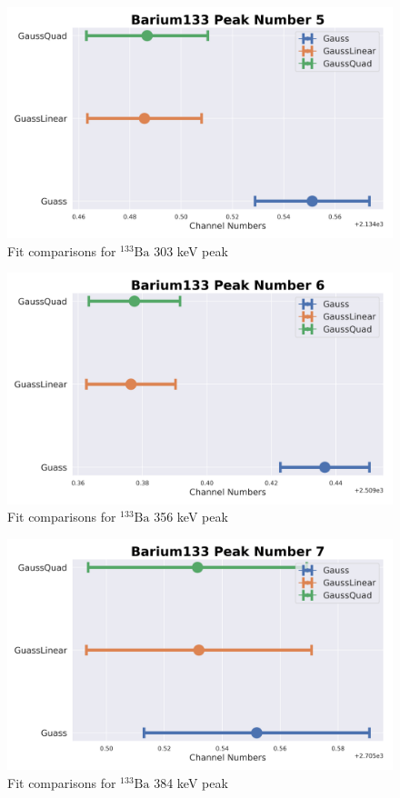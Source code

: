 \documentclass[11pt,a4paper]{article}
\newcommand{\element}[2]{$^{#2}\textrm{#1}$}
\begin{document}
\begin{figure}[H]
  \centering
  \includegraphics[width=0.95\linewidth]{./Images/Barium133/FitComparison_Peak5.png}
  \caption{Fit comparisons for \element{Ba}{133} 303 keV peak}
\end{figure}

\begin{figure}[H]
  \centering
  \includegraphics[width=0.95\linewidth]{./Images/Barium133/FitComparison_Peak6.png}
  \caption{Fit comparisons for \element{Ba}{133} 356 keV peak}
\end{figure}

\begin{figure}[H]
  \centering
  \includegraphics[width=0.95\linewidth]{./Images/Barium133/FitComparison_Peak7.png}
  \caption{Fit comparisons for \element{Ba}{133} 384 keV peak}
\end{figure}
\clearpage
\end{document}

